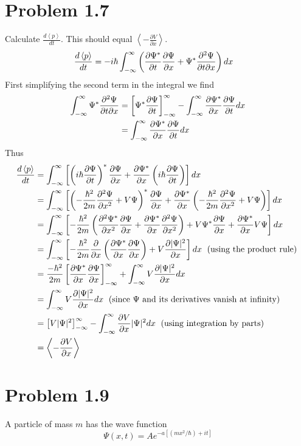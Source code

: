 \documentclass{article}
\newcommand{\ddt}[1]{\frac{\partial #1}{\partial t}}
\newcommand{\ddx}[1]{\frac{\partial #1}{\partial x}}
\newcommand{\dddx}[1]{\frac{\partial^2 #1}{\partial x^2}}
\newcommand{\bracket}[1]{\left[ #1 \right]}
\newcommand{\paren}[1]{\left( #1 \right)}
\newcommand{\braket}[1]{\left\langle #1 \right\rangle}
\begin{document}
\section{Problem 1.7}
Calculate $\frac{d\braket{p}}{dt}$. This should equal $\braket{-\frac{\partial V}{\partial x}}$.
\begin{align*}
  \frac{d\braket{p}}{dt} &= -i\hbar \intinf \paren{\ddt{\Psi^*} \ddx{\Psi} + \Psi^* \frac{\partial^2 \Psi}{\partial t \partial x}}dx
\end{align*}
First simplifying the second term in the integral we find
\begin{align*}
  \intinf \Psi^* \frac{\partial^2 \Psi}{\partial t \partial x} &= \bracket{\Psi^* \ddt\Psi}^{\infty}_{-\infty} - \intinf \ddx{\Psi^*} \ddt{\Psi} dx \\
                                                               &= \intinf \ddx{\Psi^*} \ddt{\Psi} dx
\end{align*}
Thus
\begin{align*}
  \frac{d\braket{p}}{dt} &= \intinf \bracket{\paren{i\hbar \ddt{\Psi}}^* \ddx{\Psi} + \ddx{\Psi^*}\paren{i\hbar\ddt{\Psi}}}dx \\
                         &= \intinf \bracket{\paren{-\frac{\hbar^2}{2m} \dddx{\Psi} + V \Psi}^*\ddx{\Psi} + \ddx{\Psi^*} \paren{-\frac{\hbar^2}{2m} \dddx{\Psi} + V \Psi}}dx \\
                         &= \intinf \bracket{-\frac{\hbar^2}{2m} \paren{\dddx{\Psi^*} \ddx\Psi + \ddx{\Psi^*} \dddx\Psi} + V \Psi^* \ddx\Psi + \ddx{\Psi^*} V \Psi}dx \\
                         &= \intinf \bracket{-\frac{\hbar^2}{2m} \ddx{} \paren{\ddx{\Psi^*} \ddx{\Psi}} + V \ddx{|\Psi|^2}}dx \text{\; (using the product rule) } \\
                         &= \frac{-\hbar^2}{2m}\bracket{\ddx{\Psi^*}\ddx\Psi}^\infty_{-\infty} + \intinf V \ddx{|\Psi|^2}dx \\
                         &= \intinf V \ddx{|\Psi|^2}dx \text{\; (since $\Psi$ and its derivatives vanish at infinity)}\\
                         &= \bracket{V|\Psi|^2}^\infty_{-\infty} - \intinf \ddx{V}|\Psi|^2 dx \text{\; (using integration by parts)} \\
                         &= \braket{-\ddx{V}}
\end{align*}

\section{Problem 1.9}
A particle of mass $m$ has the wave function
\[ \Psi(x,t) = Ae^{-a\bracket{(mx^2/\hbar) + it}} \]
\end{document}
